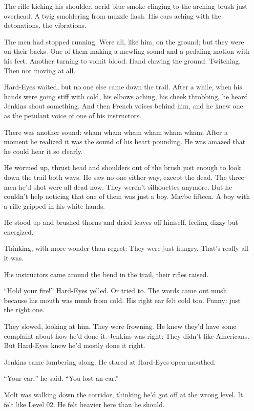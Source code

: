 The rifle kicking his shoulder, acrid blue smoke clinging to the arching brush just overhead. A twig smoldering from muzzle flash. His ears aching with the detonations, the vibrations.

The men had stopped running. Were all, like him, on the ground; but they were on their backs. One of them making a mewling sound and a pedaling motion with his feet. Another turning to vomit blood. Hand clawing the ground. Twitching. Then not moving at all.

Hard-Eyes waited, but no one else came down the trail. After a while, when his hands were going stiff with cold, his elbows aching, his cheek throbbing, he heard Jenkins shout something. And then French voices behind him, and he knew one as the petulant voice of one of his instructors.

There was another sound: wham wham wham wham wham wham. After a moment he realized it was the sound of his heart pounding. He was amazed that he could hear it so clearly.

He wormed up, thrust head and shoulders out of the brush just enough to look down the trail both ways. He saw no one either way, except the dead. The three men he’d shot were all dead now. They weren’t silhouettes anymore. But he couldn’t help noticing that one of them was just a boy. Maybe fifteen. A boy with a rifle gripped in his white hands.

He stood up and brushed thorns and dried leaves off himself, feeling dizzy but energized.

Thinking, with more wonder than regret: They were just hungry. That’s really all it was.

His instructors came around the bend in the trail, their rifles raised.

“Hold your fire!” Hard-Eyes yelled. Or tried to. The words came out mush because his mouth was numb from cold. His right ear felt cold too. Funny: just the right one.

They slowed, looking at him. They were frowning. He knew they’d have some complaint about how he’d done it. Jenkins was right: They didn’t like Americans. But Hard-Eyes knew he’d mostly done it right.

Jenkins came lumbering along. He stared at Hard-Eyes open-mouthed.

“Your ear,” he said. “You lost an ear.”

Molt was walking down the corridor, thinking he’d got off at the wrong level. It felt like Level 02. He felt heavier here than he should.

